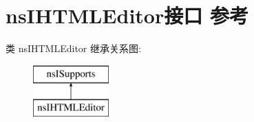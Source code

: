 \hypertarget{interfacens_i_h_t_m_l_editor}{}\section{ns\+I\+H\+T\+M\+L\+Editor接口 参考}
\label{interfacens_i_h_t_m_l_editor}
类 ns\+I\+H\+T\+M\+L\+Editor 继承关系图\+:\begin{figure}[H]
\begin{center}
\leavevmode
\includegraphics[height=2.000000cm]{interfacens_i_h_t_m_l_editor}
\end{center}
\end{figure}
